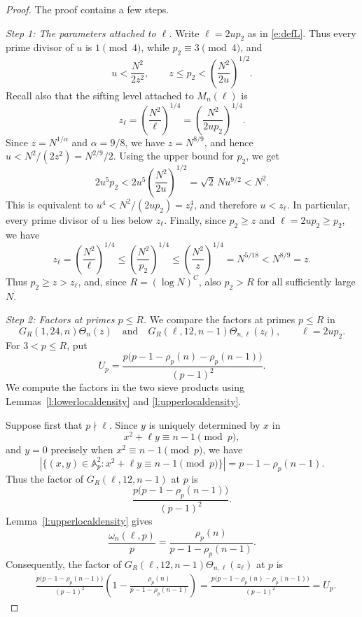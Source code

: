 \documentclass[12pt,reqno]{amsart}
\numberwithin{equation}{section}
\theoremstyle{definition}
\theoremstyle{remark}
\begin{document}
\begin{proof}
The proof contains a few steps. 

\emph{Step 1: The parameters attached to \(\ell\).}
Write \(\ell=2up_2\) as in \eqref{e:defL}.  Thus every prime divisor
of \(u\) is \(1\pmod4\), while \(p_2\equiv3\pmod4\), and
\[
 u<\frac{N^2}{2z^2},\qquad
 z\leq p_2<\left(\frac{N^2}{2u}\right)^{1/2}.
\]
Recall also that the sifting level attached to \(M_n(\ell)\) is
\[
 z_\ell=\left(\frac{N^2}{\ell}\right)^{1/4}
       =\left(\frac{N^2}{2up_2}\right)^{1/4}.
\]
Since \(z=N^{1/\alpha}\) and \(\alpha=9/8\), we have \(z=N^{8/9}\), and
hence \(u<N^2/(2z^2)=N^{2/9}/2\).  Using the upper bound for \(p_2\), we get
\[
 2u^5p_2
 <
 2u^5\left(\frac{N^2}{2u}\right)^{1/2}
 =
 \sqrt2\,Nu^{9/2}
 <
 N^2.
\]
This is equivalent to \(u^4<N^2/(2up_2)=z_\ell^4\), and therefore
\(u<z_\ell\).  In particular, every prime divisor of \(u\) lies below
\(z_\ell\). Finally, since \(p_2\geq z\) and \(\ell=2up_2\geq p_2\), we have
\[
 z_\ell
 =\left(\frac{N^2}{\ell}\right)^{1/4}
 \leq\left(\frac{N^2}{p_2}\right)^{1/4}
 \leq\left(\frac{N^2}{z}\right)^{1/4}
 =N^{5/18}<N^{8/9}=z.
\]
Thus \(p_2\geq z>z_\ell\), and, since \(R=(\log N)^C\), also
\(p_2>R\) for all sufficiently large \(N\).



\emph{Step 2: Factors at primes \(p\leq R\).}
We compare the factors at primes \(p\leq R\) in
\[
 G_R(1,24,n)\Theta_n(z)
 \quad\text{and}\quad
 G_R(\ell,12,n-1)\Theta_{n,\ell}(z_\ell),
 \qquad \ell=2up_2.
\]
For \(3<p\leq R\), put
\[
 U_p=
 \frac{p\bigl(p-1-\rho_p(n)-\rho_p(n-1)\bigr)}
 {(p-1)^2}.
\]
We compute the factors in the two sieve products using
Lemmas~\ref{l:lowerlocaldensity} and
\ref{l:upperlocaldensity}.

Suppose first that \(p\nmid\ell\).  Since \(y\) is uniquely determined
by \(x\) in
\[
 x^2+\ell y\equiv n-1\pmod p,
\]
and \(y=0\) precisely when \(x^2\equiv n-1\pmod p\), we have
\[
 \left|\{(x,y)\in\mathbb A_p^2:
 x^2+\ell y\equiv n-1\pmod p\}\right|
 =p-1-\rho_p(n-1).
\]
Thus the factor of \(G_R(\ell,12,n-1)\) at \(p\) is
\[
 \frac{p\bigl(p-1-\rho_p(n-1)\bigr)}{(p-1)^2}.
\]
Lemma~\ref{l:upperlocaldensity} gives
\[
 \frac{\omega_n(\ell,p)}p
 =
 \frac{\rho_p(n)}
 {p-1-\rho_p(n-1)}.
\]
Consequently, the factor of
\(G_R(\ell,12,n-1)\Theta_{n,\ell}(z_\ell)\) at \(p\) is
\begin{align*}
 &\frac{p\bigl(p-1-\rho_p(n-1)\bigr)}{(p-1)^2}
 \left(
 1-\frac{\rho_p(n)}
 {p-1-\rho_p(n-1)}
 \right)=
 \frac{p\bigl(p-1-\rho_p(n)-\rho_p(n-1)\bigr)}
 {(p-1)^2}
 =U_p.
\end{align*}


\end{proof}
\end{document}

